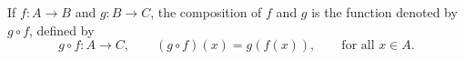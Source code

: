 If $f: A \to B$ and $g: B \to C$, the composition of $f$ and $g$ is the function denoted by $g \circ f$, defined by
$$g \circ f: A \to C, \qquad (g \circ f)(x) = g(f(x)), \qquad \text{for all } x \in A.$$
